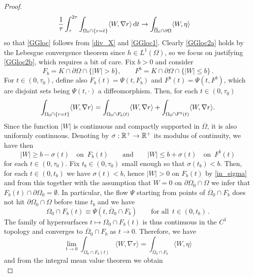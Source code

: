 \documentclass[10 pt,a4paper]{article}
\theoremstyle{definition}
\begin{document}
\begin{proof}
\begin{align}
		\label{GGloc2b}
		\frac{1}{\tau} \int_\tau^{2\tau} \int_{\Omega_0\cap\{r=t\}} 
		\langle W, \nabla r\rangle \, \mathrm{d} t & \to \int_{\overline{\Omega}_0\cap\partial\Omega} \langle W,\eta\rangle	
	\end{align}
	so that \eqref{GGloc} follows from \eqref{div_X} and \eqref{GGloc1}. Clearly \eqref{GGloc2a} holds by the Lebesgue convergence theorem since $h\in L^1(\Omega)$, so we focus on justifying \eqref{GGloc2b}, which requires a bit of care. Fix $b>0$ and consider
	\[
	F_b = K \cap \partial \Omega \cap \{|W| > b\}, \qquad F^b = K \cap \partial \Omega \cap \{|W| \leq b\} \, .
	\] 
	For $t \in (0, \tau_0)$, define also $F_b(t) = \Psi(t, F_b)$ and $F^b(t) = \Psi(t, F^b)$, which are disjoint sets being $\Psi(t,\cdot)$ a diffeomorphism. Then, for each $t\in(0,\tau_0)$
	\begin{equation} \label{eq_int}
		\displaystyle \int_{\Omega_0\cap\{r=t\}} \langle W, \nabla r\rangle = \int_{\Omega_0 \cap F_b(t)} \langle W, \nabla r\rangle + \int_{\Omega_0\cap F^b(t)} \langle W, \nabla r\rangle .
	\end{equation}
	Since the function $|W|$ is continuous and compactly supported in $\overline{\Omega}$, it is also uniformly continuous. Denoting by $\sigma : \mathbb R^+ \to \mathbb R^+$ its modulus of continuity, we have then
	\begin{equation} \label{in_sigma}
		|W| \geq b - \sigma(t) \quad \text{on } \, F_b(t) \qquad \text{and} \qquad |W| \leq b + \sigma(t) \quad \text{on } \, F^b(t)
	\end{equation}
	for each $t\in(0,\tau_0)$. Fix $t_b\in(0,\tau_0)$ small enough so that $\sigma(t_b) < b$. Then, for each $t\in(0,t_b)$ we have $\sigma(t) < b$, hence $|W|>0$ on $F_b(t)$ by \eqref{in_sigma} and from this together with the assumption that $W=0$ on $\partial\Omega_0 \cap \Omega$ we infer that $F_b(t) \cap \partial\Omega_0 = \emptyset$. In particular, the flow $\Psi$ starting from points of $\overline{\Omega}_0 \cap F_b$ does not hit $\partial\Omega_0 \cap \Omega$ before time $t_b$ and we have
	\[
	\Omega_0 \cap F_b(t) \equiv \Psi(t,\overline{\Omega}_0 \cap F_b) \qquad \text{for all } \, t \in (0,t_b) \, .
	\] 
	The family of hypersurfaces $t \mapsto \Omega_0 \cap F_b(t)$ is thus continuous in the $C^1$ topology and converges to $\overline\Omega_0 \cap F_b$ as $t\to0$. Therefore, we have
	\[
	\lim_{t\to0} \int_{\Omega_0 \cap F_b(t)} \langle W, \nabla r \rangle = \int_{\overline{\Omega}_0\cap F_b} \langle W, \eta\rangle
	\]
	and from the integral mean value theorem we obtain
	\begin{equation}\label{eq_int2}

\end{equation}
\end{proof}
\end{document}
